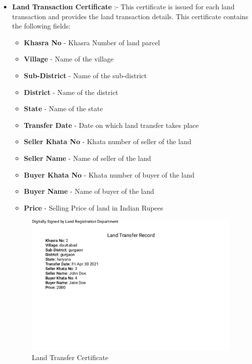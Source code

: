 \documentclass{article}
\begin{document}
\begin{itemize}
            \item \textbf{Land Transaction Certificate} :-  This certificate is issued for each land transaction and provides the land transaction details. This certificate contains the following fields:
             \begin{itemize}
                \item \textbf{Khasra No} - Khasra Number of land parcel
                \item \textbf{Village} - Name of the village
                \item \textbf{Sub-District} - Name of the sub-district 
                \item \textbf{District} - Name of the district
                \item \textbf{State} - Name of the state
                \item \textbf{Transfer Date} - Date on which land transfer takes place
                \item \textbf{Seller Khata No} - Khata number of seller of the land
                \item \textbf{Seller Name} - Name of seller of the land
                \item \textbf{Buyer Khata No} - Khata number of buyer of the land
                \item \textbf{Buyer Name} - Name of buyer of the land
                \item \textbf{Price} - Selling Price of land in Indian Rupees
            \end{itemize}
            \begin{figure}[htbp]
                \includegraphics[scale=0.5, frame]{landtransfercertificate.png}
                \centering
                \caption{Land Transfer Certificate}
            \end{figure}
        \end{itemize}
        
\end{document}
